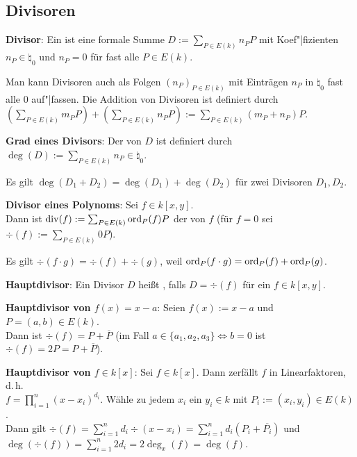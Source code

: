 \pagebreak

\subsection{%
    Divisoren%
}

\textbf{Divisor}:
Ein  ist eine formale Summe $D := \sum_{P \in E(k)} n_P P$ mit Koef"|fizienten
$n_P \in \natural_0$ und $n_P = 0$ für fast alle $P \in E(k)$.

Man kann Divisoren auch als Folgen $(n_P)_{P \in E(k)}$ mit Einträgen $n_P$ in $\natural_0$
fast alle $0$ auf"|fassen.
Die Addition von Divisoren ist definiert durch\\
$(\sum_{P \in E(k)} m_P P) + (\sum_{P \in E(k)} n_P P) := \sum_{P \in E(k)} (m_P + n_P) P$.

\linie

\textbf{Grad eines Divisors}:
Der  von $D$ ist definiert durch $\deg(D) := \sum_{P \in E(k)} n_P \in \natural_0$.

Es gilt $\deg(D_1 + D_2) = \deg(D_1) + \deg(D_2)$ für zwei Divisoren $D_1, D_2$.

\linie

\textbf{Divisor eines Polynoms}:
Sei $f \in k[x, y]$.\\
Dann ist $\operatorname{div}(f) := \sum_{P \in E(k)} \operatorname{ord}_P(f) P$ der  von $f$
(für $f = 0$ sei $\div(f) := \sum_{P \in E(k)} 0P$).

Es gilt $\div(f \cdot g) = \div(f) + \div(g)$, weil
$\operatorname{ord}_P(f \cdot g) = \operatorname{ord}_P(f) + \operatorname{ord}_P(g)$.

\linie

\textbf{Hauptdivisor}:
Ein Divisor $D$ heißt , falls $D = \div(f)$ für ein $f \in k[x, y]$.

\textbf{Hauptdivisor von $f(x) = x - a$}:
Seien $f(x) := x - a$ und $P = (a, b) \in E(k)$.\\
Dann ist $\div(f) = P + \overline{P}$
(im Fall $a \in \{a_1, a_2, a_3\} \iff b = 0$ ist $\div(f) = 2P = P + \overline{P}$).

\textbf{Hauptdivisor von $f \in k[x]$}:
Sei $f \in k[x]$.
Dann zerfällt $f$ in Linearfaktoren, d.\,h.\\
$f = \prod_{i=1}^n (x - x_i)^{d_i}$.
Wähle zu jedem $x_i$ ein $y_i \in k$ mit $P_i := (x_i, y_i) \in E(k)$.\\
Dann gilt $\div(f) = \sum_{i=1}^n d_i \div(x - x_i) = \sum_{i=1}^n d_i (P_i + \overline{P_i})$
und\\
$\deg(\div(f)) = \sum_{i=1}^n 2d_i = 2\deg_x(f) = \deg(f)$.

